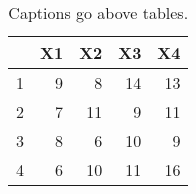 \begin{table}[ht]
\centering
\caption{Captions go above tables.} 
\label{t1}
\begin{tabular}{rrrrr}
  \hline
 & X1 & X2 & X3 & X4 \\ 
  \hline
1 &   9 &   8 &  14 &  13 \\ 
  2 &   7 &  11 &   9 &  11 \\ 
  3 &   8 &   6 &  10 &   9 \\ 
  4 &   6 &  10 &  11 &  16 \\ 
   \hline
\end{tabular}
\end{table}
